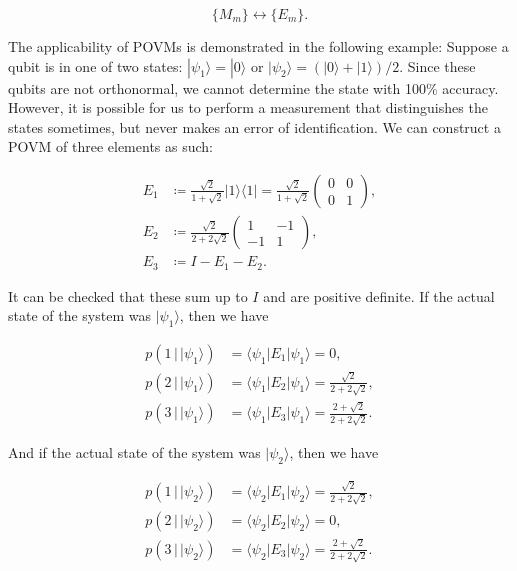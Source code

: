 \documentclass{article}
\newcounter{example}[section]
\begin{document}
        \begin{equation}
          \{M_m\} \longleftrightarrow \{E_m\}.
        \end{equation}

      The applicability of POVMs is demonstrated in the following example: Suppose a qubit is in one of two states: $|\psi_1 \rangle = |0 \rangle$ or $|\psi_2 \rangle = (|0 \rangle + |1 \rangle)/2$. Since these qubits are not orthonormal, we cannot determine the state with 100\% accuracy. However, it is possible for us to perform a measurement that distinguishes the states sometimes, but never makes an error of identification. We can construct a POVM of three elements as such:

      \begin{align*}
        E_1 & \coloneqq \frac{\sqrt{2}}{1 + \sqrt{2}} |1\rangle \langle 1| = \frac{\sqrt{2}}{1 + \sqrt{2}} \begin{pmatrix} 0&0\\0&1 \end{pmatrix}, \\
        E_2 & \coloneqq \frac{\sqrt{2}}{2 + 2 \sqrt{2}} \begin{pmatrix} 1 & -1 \\ -1 & 1 \end{pmatrix}, \\
        E_3 & \coloneqq I - E_1 - E_2.
      \end{align*}

      It can be checked that these sum up to $I$ and are positive definite. If the actual state of the system was $|\psi_1 \rangle$, then we have

      \begin{align*}
        p(1 \,|\, |\psi_1 \rangle) & = \langle \psi_1 | E_1 | \psi_1 \rangle = 0, \\
        p(2 \,|\, |\psi_1 \rangle) & = \langle \psi_1 | E_2 | \psi_1 \rangle = \frac{\sqrt{2}}{2 + 2\sqrt{2}}, \\
        p(3 \,|\, |\psi_1 \rangle) & = \langle \psi_1 | E_3 | \psi_1 \rangle =  \frac{2 + \sqrt{2}}{2 + 2\sqrt{2}}.
      \end{align*}

      And if the actual state of the system was $|\psi_2 \rangle$, then we have

      \begin{align*}
        p(1 \,|\, |\psi_2 \rangle) & = \langle \psi_2 | E_1 | \psi_2 \rangle = \frac{\sqrt{2}}{2 + 2\sqrt{2}}, \\
        p(2 \,|\, |\psi_2 \rangle) & = \langle \psi_2 | E_2 | \psi_2 \rangle = 0, \\
        p(3 \,|\, |\psi_2 \rangle) & = \langle \psi_2 | E_3 | \psi_2 \rangle =  \frac{2 + \sqrt{2}}{2 + 2\sqrt{2}}.
      \end{align*}
\end{document}
